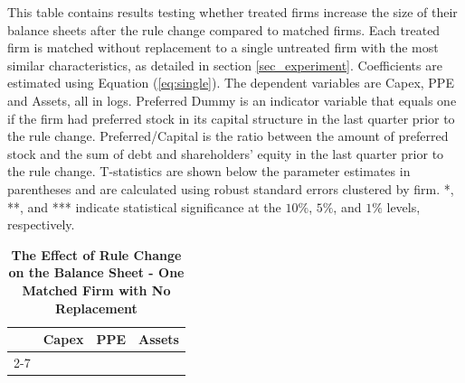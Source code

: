 \documentclass[a4paper, 12pt]{article}
\begin{document}
\begin{table}[htbp]
\caption{\textbf{The Effect of Rule Change on the Balance Sheet - One Matched Firm with No Replacement}} \label{table_bs_alt}
\begin{singlespace}
\begin{small}

\noindent This table contains results testing whether treated firms increase the size of their balance sheets after the rule change compared to matched firms. Each treated firm is matched without replacement to a single untreated firm with the most similar characteristics, as detailed in section \ref{sec_experiment}.  Coefficients are estimated using Equation (\ref{eq:single}). The dependent variables are Capex, PPE and Assets, all in logs. Preferred Dummy is an indicator variable that equals one if the firm had preferred stock in its capital structure in the last quarter prior to the rule change. Preferred/Capital is the ratio between the amount of preferred stock and the sum of debt and shareholders' equity in the last quarter prior to the rule change. T-statistics are shown below the parameter estimates in parentheses and are calculated using robust standard errors clustered by firm. *, **, and *** indicate statistical significance at the $10\%$, $5\%$, and $1\%$ levels, respectively.

\end{small}
\end{singlespace}
\vspace{3mm}
\small
  \centering
    \begin{tabular}{lcccccc}
    \toprule
    \textbf{ } &
      \multicolumn{2}{c}{\textbf{Capex}} &  \multicolumn{2}{c}{\textbf{PPE}} &
      \multicolumn{2}{c}{\textbf{Assets}}
      \\
      \cline{2-7}
  


    \bottomrule
    \end{tabular}
\end{table}
\clearpage

\newpage
\end{document}
